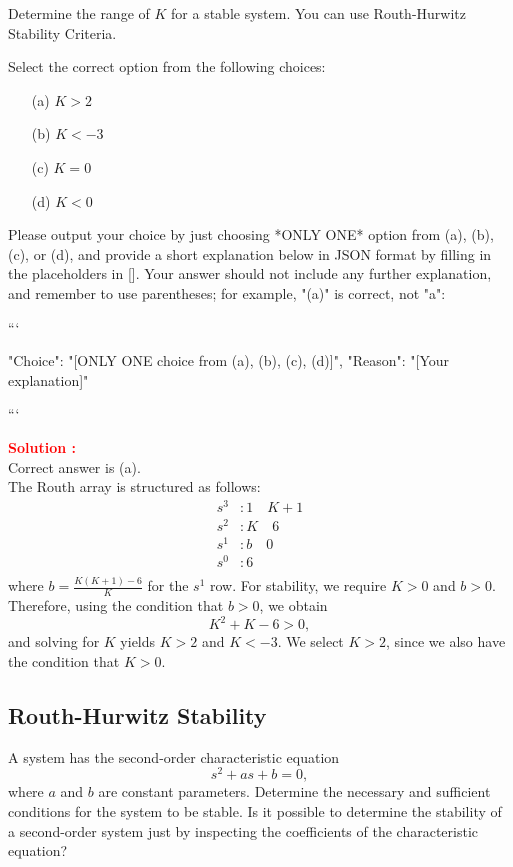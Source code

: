 \documentclass[12pt]{article}
\begin{document}
Determine the range of \(K\) for a stable system. You can use Routh-Hurwitz Stability Criteria.

Select the correct option from the following choices:
\begin{itemize}
    \item[(a)] $K>2$
    \item[(b)] $K<-3$
    \item[(c)] $K=0$
    \item[(d)] $K<0$
\end{itemize}


Please output your choice by just choosing *ONLY ONE* option from (a), (b), (c), or (d), and provide a short explanation below in JSON format by filling in the placeholders in []. Your answer should not include any further explanation, and remember to use parentheses; for example, "(a)" is correct, not "a":

```

{
"Choice": "[ONLY ONE choice from (a), (b), (c), (d)]",
"Reason": "[Your explanation]"
}

```

\textbf{\textcolor{red}{Solution :}} \\
Correct answer is (a).\\
The Routh array is structured as follows:
\begin{align*}
    s^3 & : 1 \quad K+1 \\
    s^2 & : K \quad 6 \\
    s^1 & : b \quad 0 \\
    s^0 & : 6 \\
\end{align*}
where \(b = \frac{K(K + 1) - 6}{K}\) for the \(s^1\) row. For stability, we require \(K > 0\) and \(b > 0\). Therefore, using the condition that \(b > 0\), we obtain
\begin{equation}
    K^2 + K - 6 > 0,
\end{equation}
and solving for \(K\) yields \(K > 2\) and \(K < -3\). We select \(K > 2\), since we also have the condition that \(K > 0\).
\clearpage

\subsection{Routh-Hurwitz Stability}


A system has the second-order characteristic equation
\begin{equation}
    s^2 + as + b = 0,
\end{equation}
where \(a\) and \(b\) are constant parameters. Determine the necessary and sufficient conditions for the system to be stable. Is it possible to determine the stability of a second-order system just by inspecting the coefficients of the characteristic equation?\\
\end{document}
